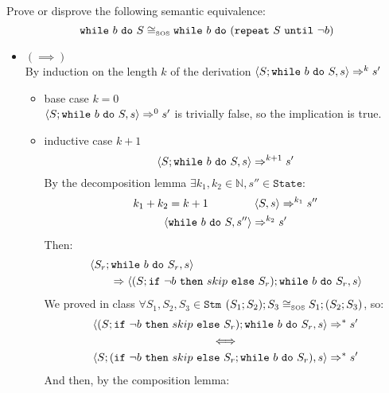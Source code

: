 \begin{exercise}{
    Prove or disprove the following semantic equivalence:
    \[ \texttt{while}\ b\ \texttt{do}\ S \cong_{\text{\tiny SOS}} \texttt{while}\ b\ \texttt{do}\ (\texttt{repeat}\ S\ \texttt{until}\ \neg b)  \]\vspace*{-0.6cm}
}
\begin{itemize}
\begin{itemize}
                \item $(\implies)$ \vspace{0.2cm} \\
                    By induction on the length $k$ of the derivation $\left<S;\texttt{while}\ b\ \texttt{do}\ S, s\right> \Rightarrow^k s'$
                    \begin{itemize}
                        \item base case $k=0$ \\
                            $\left<S;\texttt{while}\ b\ \texttt{do}\ S, s\right> \Rightarrow^0 s'$ is trivially false, so the implication is true.
                        \item inductive case $k+1$ \vspace*{-0.3cm}
                            \[ \left<S;\texttt{while}\ b\ \texttt{do}\ S, s\right> \Rightarrow^{k+1} s' \]
                            By the decomposition lemma $\exists k_1, k_2 \in \mathbb{N}, s'' \in \texttt{State} :$
                            \begin{gather*}
                                k_1 + k_2 = k + 1\qquad\qquad \left<S, s\right> \Rightarrow^{k_1} s'' \\
                                \left<\texttt{while}\ b\ \texttt{do}\ S, s''\right> \Rightarrow^{k_2} s'
                            \end{gather*}
                            Then:
                            \begin{align*}
                                &\left<S_r; \texttt{while}\ b\ \texttt{do}\ S_r, s\right>
                                \\&\qquad\Rightarrow \left<(S;\texttt{if}\ \neg b\ \texttt{then}\ skip\ \texttt{else}\ S_r); \texttt{while}\ b\ \texttt{do}\ S_r, s\right>
                            \end{align*}
                            We proved in class $\forall S_1, S_2, S_3 \in \texttt{Stm}$ $(S_1;S_2);S_3 \cong_{\text{\tiny SOS}} S_1;(S_2;S_3)$, so:
                            \begin{gather*}
                                \left<(S;\texttt{if}\ \neg b\ \texttt{then}\ skip\ \texttt{else}\ S_r); \texttt{while}\ b\ \texttt{do}\ S_r, s\right> \Rightarrow^* s'
                                \\
                                \iff
                                \\
                                \left<S;(\texttt{if}\ \neg b\ \texttt{then}\ skip\ \texttt{else}\ S_r; \texttt{while}\ b\ \texttt{do}\ S_r), s\right> \Rightarrow^* s'
                            \end{gather*}
                            And then, by the composition lemma:
                            \begin{align*}

\end{align*}
\end{itemize}
\end{itemize}
\end{itemize}
\end{exercise}
